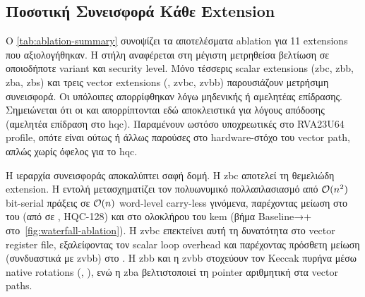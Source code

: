 \subsection{Ποσοτική Συνεισφορά Κάθε Extension}
\label{ssec:ablation-quantitative}

Ο \cref{tab:ablation-summary} συνοψίζει τα αποτελέσματα ablation για
\num{11} extensions που αξιολογήθηκαν. Η στήλη  αναφέρεται
στη μέγιστη μετρηθείσα βελτίωση σε οποιοδήποτε variant και security level.
Μόνο τέσσερις scalar extensions (\gls{zbc}, \gls{zbb}, \gls{zba}, \gls{zbs}) και
τρεις vector extensions (\RVV, \gls{zvbc}, \gls{zvbb}) παρουσιάζουν μετρήσιμη
συνεισφορά. Οι υπόλοιπες απορρίφθηκαν λόγω μηδενικής ή αμελητέας
επίδρασης. Σημειώνεται ότι οι  και  απορρίπτονται εδώ αποκλειστικά για λόγους απόδοσης (αμελητέα επίδραση στο \gls{hqc}). Παραμένουν ωστόσο υποχρεωτικές στο RVA23U64 profile, οπότε είναι ούτως ή άλλως παρούσες στο hardware-στόχο του vector path, απλώς χωρίς όφελος για το \gls{hqc}.

\begin{table}[htbp]
  \centering
  \caption{Συγκεντρωτικά αποτελέσματα ISA ablation (HQC-128, Spike ISS).
    Η στήλη  αναφέρεται στον αριθμό εντολών της extension που
    εντοπίζονται στο ELF μέσω . Η στήλη 
    αντιπροσωπεύει τη μέγιστη μετρηθείσα μείωση \instret σε οποιοδήποτε
    variant. Για \gls{zvbc}/\gls{zvbb} η μέτρηση είναι συνδυαστική (commit ),
    βλ.\ \cref{fig:waterfall-ablation}.}
  \label{tab:ablation-summary}
  \small
  
\end{table}

Η ιεραρχία συνεισφοράς αποκαλύπτει σαφή δομή. Η \gls{zbc} αποτελεί τη
θεμελιώδη extension. Η εντολή \clmul μετασχηματίζει τον πολυωνυμικό
πολλαπλασιασμό από $\mathcal{O}(n^2)$ bit-serial πράξεις σε $\mathcal{O}(n)$
word-level carry-less γινόμενα, παρέχοντας μείωση  στο \instret
του  (από  σε , HQC-128) και
 στο \instret \Decaps ολοκλήρου του \gls{kem} (βήμα Baseline→+\Zbc
στο~\cref{fig:waterfall-ablation}). Η \gls{zvbc} επεκτείνει αυτή τη δυνατότητα στο vector
register file, εξαλείφοντας τον scalar loop overhead και παρέχοντας
πρόσθετη μείωση  (συνδυαστικά με \gls{zvbb}) στο \Decaps \instret.
Η \gls{zbb} και η \gls{zvbb} στοχεύουν τον Keccak
πυρήνα μέσω native rotations (\rori, ), ενώ η \gls{zba}
βελτιστοποιεί τη pointer αριθμητική στα vector paths.

